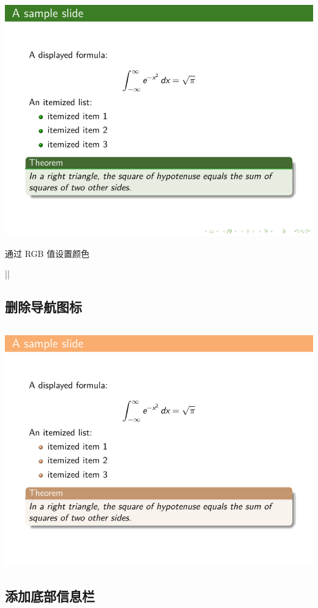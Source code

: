 \begin{column}{0.5\textwidth}
\includegraphics{examples/beamer/beamertheme04.pdf}

通过 RGB 值设置颜色

|| 

\subsection{删除导航图标}

\inputminted[linenos=true]{latex}{examples/beamer/beamertheme05.tex}

\includegraphics{examples/beamer/beamertheme05.pdf}

\subsection{添加底部信息栏}


\end{column}
